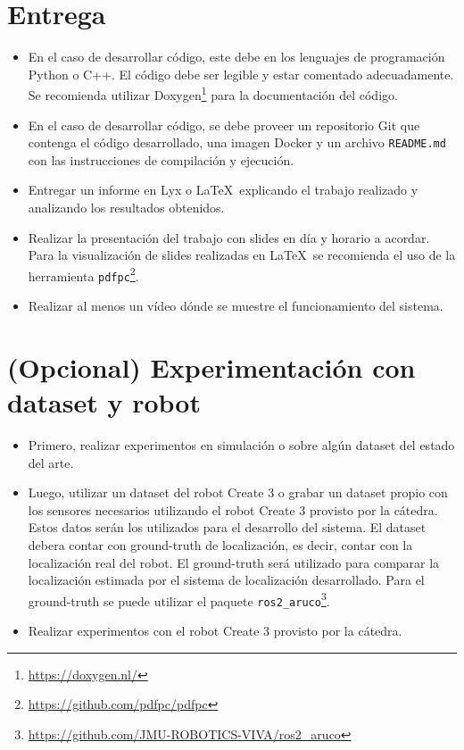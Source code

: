 \documentclass[tp]{lcc}
\begin{document}
	\section{Entrega}
	\begin{itemize}
		
		\item En el caso de desarrollar código, este debe en los lenguajes de programación Python o C++. El código debe ser legible y estar comentado adecuadamente. Se recomienda utilizar Doxygen\footnote{\url{https://doxygen.nl/}} para la documentación del código.
		
		\item En el caso de desarrollar código, se debe proveer un repositorio Git que contenga el código desarrollado, una imagen Docker y un archivo \lstinline{README.md} con las instrucciones de compilación y ejecución.
		
		\item Entregar un informe en Lyx o \LaTeX\  explicando el trabajo realizado y analizando los resultados obtenidos.

		\item Realizar la presentación del trabajo con slides en día y horario a acordar. Para la visualización de slides realizadas en \LaTeX\ se recomienda el uso de la herramienta \lstinline{pdfpc}\footnote{\url{https://github.com/pdfpc/pdfpc}}.
        
        \item Realizar al menos un vídeo dónde se muestre el funcionamiento del sistema.         
	\end{itemize}

	
	\section{(Opcional) Experimentación con dataset y robot}
	\begin{itemize}
        
        \item Primero, realizar experimentos en simulación o sobre algún dataset del estado del arte.
        
		\item Luego, utilizar un dataset del robot Create 3 o grabar un dataset propio con los sensores necesarios utilizando el robot Create 3 provisto por la cátedra. Estos datos serán los utilizados para el desarrollo del sistema. El dataset debera contar con ground-truth de localización, es decir, contar con la localización real del robot. El ground-truth será utilizado para comparar la localización estimada por el sistema de localización desarrollado. Para el ground-truth se puede utilizar el paquete \lstinline{ros2_aruco}\footnote{\url{https://github.com/JMU-ROBOTICS-VIVA/ros2_aruco}}. 
		
		\item Realizar experimentos con el robot Create 3 provisto por la cátedra.
	\end{itemize}
	
\end{document}
